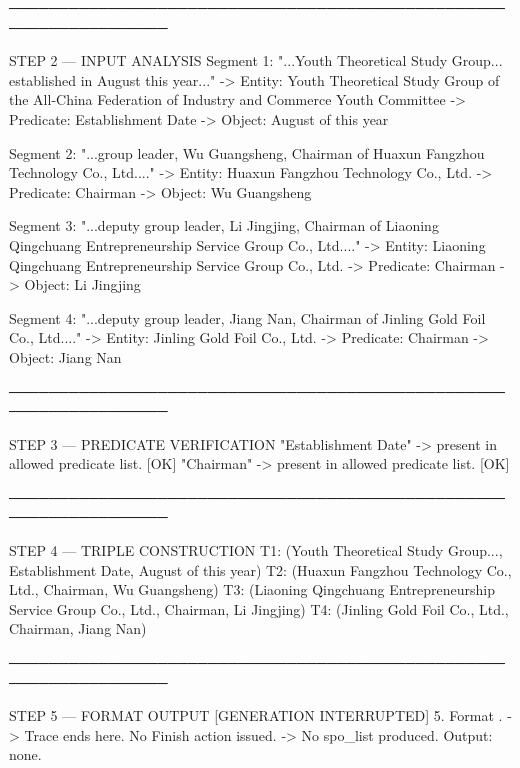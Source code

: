\begin{appendices}
\begin{tcolorbox}[tracebox, title=Model Reasoning Trace]
──────────────────────────────────────────────────────────────────

STEP 2 — INPUT ANALYSIS
  Segment 1: "...Youth Theoretical Study Group...
              established in August this year..."
    -> Entity:    Youth Theoretical Study Group of the
                  All-China Federation of Industry and Commerce
                  Youth Committee
    -> Predicate: Establishment Date
    -> Object:    August of this year

  Segment 2: "...group leader, Wu Guangsheng, Chairman of
              Huaxun Fangzhou Technology Co., Ltd...."
    -> Entity:    Huaxun Fangzhou Technology Co., Ltd.
    -> Predicate: Chairman
    -> Object:    Wu Guangsheng

  Segment 3: "...deputy group leader, Li Jingjing, Chairman of
              Liaoning Qingchuang Entrepreneurship Service
              Group Co., Ltd...."
    -> Entity:    Liaoning Qingchuang Entrepreneurship Service
                  Group Co., Ltd.
    -> Predicate: Chairman
    -> Object:    Li Jingjing

  Segment 4: "...deputy group leader, Jiang Nan, Chairman of
              Jinling Gold Foil Co., Ltd...."
    -> Entity:    Jinling Gold Foil Co., Ltd.
    -> Predicate: Chairman
    -> Object:    Jiang Nan

──────────────────────────────────────────────────────────────────

STEP 3 — PREDICATE VERIFICATION
  "Establishment Date" -> present in allowed predicate list. [OK]
  "Chairman"           -> present in allowed predicate list. [OK]

──────────────────────────────────────────────────────────────────

STEP 4 — TRIPLE CONSTRUCTION
  T1: (Youth Theoretical Study Group...,
       Establishment Date, August of this year)
  T2: (Huaxun Fangzhou Technology Co., Ltd.,
       Chairman, Wu Guangsheng)
  T3: (Liaoning Qingchuang Entrepreneurship Service Group Co., Ltd.,
       Chairman, Li Jingjing)
  T4: (Jinling Gold Foil Co., Ltd.,
       Chairman, Jiang Nan)

──────────────────────────────────────────────────────────────────

STEP 5 — FORMAT OUTPUT                    [GENERATION INTERRUPTED]
  5. Format .
  -> Trace ends here. No Finish action issued.
  -> No spo\_list produced. Output: none.
\end{tcolorbox}

\begin{tcolorbox}[errorbox, title=Example 3 — Parsing Error
(AgentRE\textsubscript{orig} Test Set Sample 20 Attempt 3)]


\end{tcolorbox}
\end{appendices}
